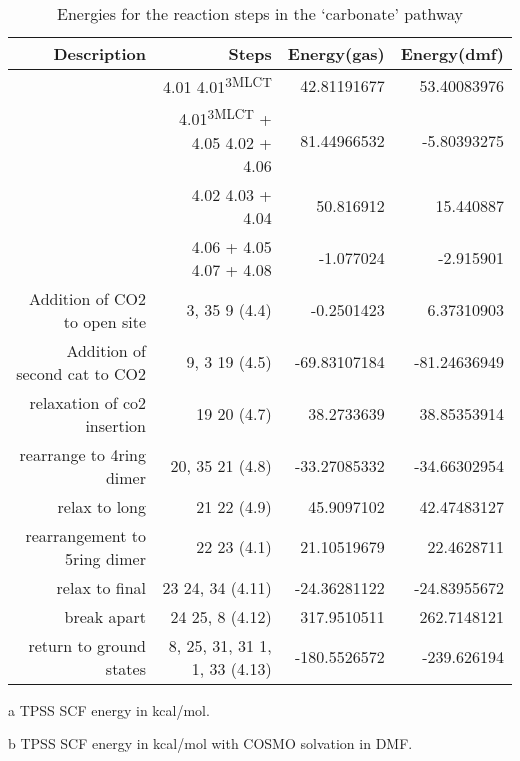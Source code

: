 \begin{table}[!htb]
\centering
 \begin{threeparttable}
  \caption{Energies for the reaction steps in the `carbonate' pathway}
    \begin{tabular}{rrrr}
    \toprule
    Description & Steps & Energy(gas)\tnote{a} & Energy(dmf)\tnote{b} \\
    \midrule
    & 4.01 \ce{->} 4.01\textsuperscript{3MLCT} & 42.81191677 &	53.40083976 \\
    & 4.01\textsuperscript{3MLCT} + 4.05 \ce{->} 4.02 + 4.06 & 81.44966532	& -5.80393275 \\
    & 4.02 \ce{->} 4.03 + 4.04 & 50.816912 & 15.440887 \\
    & 4.06 + 4.05 \ce{->} 4.07 + 4.08 & -1.077024 & -2.915901 \\
    \midrule
    Addition of CO2 to open site & 3, 35 \ce{->} 9 (4.4) & -0.2501423 & 6.37310903 \\
    Addition of second cat to CO2 & 9, 3 \ce{->} 19 (4.5) & -69.83107184 & -81.24636949 \\
    relaxation of co2 insertion & 19 \ce{->} 20 (4.7) & 38.2733639 & 38.85353914 \\
    rearrange to 4ring dimer & 20, 35 \ce{->} 21 (4.8) & -33.27085332 & -34.66302954 \\
    relax to long & 21 \ce{->} 22 (4.9) & 45.9097102 & 42.47483127 \\
    rearrangement to 5ring dimer & 22 \ce{->} 23 (4.1) & 21.10519679 & 22.4628711 \\
    relax to final & 23 \ce{->} 24, 34 (4.11) & -24.36281122 & -24.83955672 \\
    break apart & 24 \ce{->} 25, 8 (4.12) & 317.9510511 & 262.7148121 \\
    return to ground states & 8, 25, 31, 31 \ce{->} 1, 1, 33 (4.13) & -180.5526572 & -239.626194 \\
    \bottomrule
    \end{tabular}%
    \begin{tablenotes}
    \item [a] TPSS SCF energy in kcal/mol.
    \item [b] TPSS SCF energy in kcal/mol with COSMO solvation in DMF.
    \end{tablenotes}
  \label{tab.carbrxn}%
 \end{threeparttable}
\end{table}%
